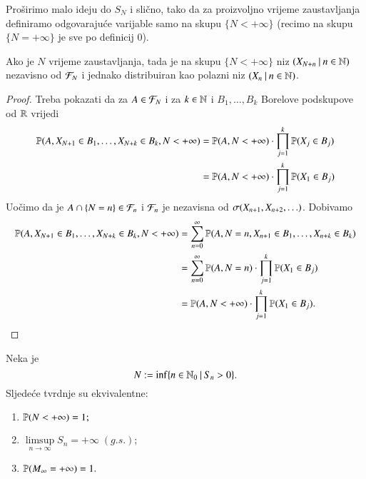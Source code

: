 Pro\v sirimo malo ideju do $S_N$ i sli\v cno, tako da za proizvoljno vrijeme zaustavljanja definiramo odgovaraju\' ce varijable samo na skupu $\{ N < + \infty \}$ (recimo na skupu $\{ N = +\infty \}$ je sve po definicij $0$).

\begin{tm} \label{tm:15.10}
    Ako je $N$ vrijeme zaustavljanja, tada je na skupu $\{ N < +\infty \}$ niz $({X_{N + n}} \: | \: {n \in \mathbb{N}})$ nezavisno od $\mathcal{F}_N$ i jednako distribuiran kao polazni niz $({X_n} \: | \: {n \in \mathbb{N}})$.
\end{tm}

\begin{proof}
    Treba pokazati da za $A \in \mathcal{F}_N$ i za $k \in \mathbb{N}$ i $B_1, \ldots, B_k$ Borelove podskupove od $\mathbb{R}$ vrijedi
    \begin{equation}    \label{jed:15.11}
        \begin{aligned}
            \mathbb{P} (A, X_{N + 1} \in B_1, \ldots, X_{N + k} \in B_k, N < +\infty) &= \mathbb{P} (A, N < +\infty) \cdot \prod\limits_{j = 1}^{k} \mathbb{P} (X_j \in B_j)\\
            &= \mathbb{P} (A, N < +\infty) \cdot \prod\limits_{j = 1}^{k} \mathbb{P} (X_1 \in B_j)
        \end{aligned}
    \end{equation}
    Uo\v cimo da je $A \cap \{ N = n \} \in \mathcal{F}_n$ i $\mathcal{F}_n$ je nezavisna od $\sigma({X_{n + 1}, X_{n + 2}, \ldots})$.
    Dobivamo
    \begin{equation*}
        \begin{aligned}
            \mathbb{P} (A, X_{N + 1} \in B_1, \ldots, X_{N + k} \in B_k, N < +\infty) &= \sum\limits_{n = 0}^{\infty} \mathbb{P} (A, N = n, X_{n + 1} \in B_1, \ldots, X_{n + k} \in B_k)\\
            &= \sum\limits_{n = 0}^{\infty} \mathbb{P} (A, N = n) \cdot \prod\limits_{j = 1}^{k} \mathbb{P} (X_1 \in B_j)\\
            &= \mathbb{P} (A, N < +\infty) \cdot \prod\limits_{j = 1}^{k} \mathbb{P} (X_1 \in B_j).
        \end{aligned}
    \end{equation*}
\end{proof}

\begin{kor} \label{kor:15.12}
    Neka je
    \begin{equation*}
        N := \inf \{{n \in \mathbb{N}_0} \: | \: {S_n > 0}\}.
    \end{equation*}
    Sljede\' ce tvrdnje su ekvivalentne:
    \begin{enumerate}[label=(\roman*)]
        \item \label{kor:15.12.1}
        $\mathbb{P} (N < + \infty) = 1;$
        \item \label{kor:15.12.2}
        $\limsup\limits_{n \to \infty} S_n = +\infty \; (g.s.);$
        \item \label{kor:15.12.3}
        $\mathbb{P} (M_\infty = +\infty) = 1.$
    \end{enumerate}
\end{kor}

